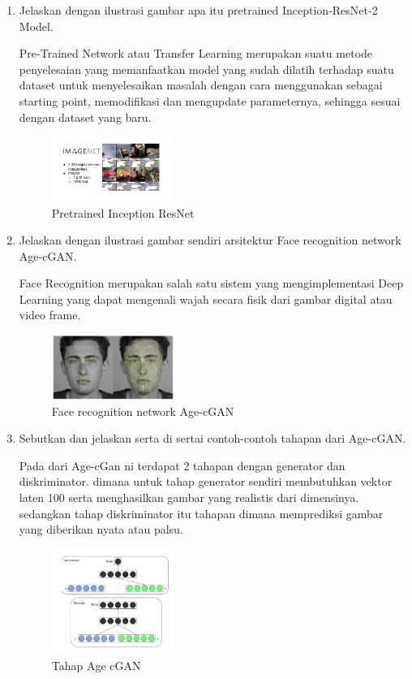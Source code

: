 \begin{enumerate}
        \item Jelaskan dengan ilustrasi gambar apa itu pretrained Inception-ResNet-2 Model.

Pre-Trained Network atau Transfer Learning merupakan suatu metode penyelesaian yang memanfaatkan model yang sudah dilatih terhadap suatu dataset untuk menyelesaikan masalah dengan cara menggunakan sebagai starting point, memodifikasi dan mengupdate parameternya, sehingga sesuai dengan dataset yang baru.

	\begin{figure}[H]
		\includegraphics[width=4cm]{figures/1174069/9/teori6.PNG}
            	\centering
           	\caption{Pretrained Inception ResNet}
       	 \end{figure}

        \item Jelaskan dengan ilustrasi gambar sendiri arsitektur Face recognition network Age-cGAN.

Face Recognition merupakan salah satu sistem yang mengimplementasi Deep Learning yang dapat mengenali wajah secara fisik dari gambar digital atau video frame.

	\begin{figure}[H]
		\includegraphics[width=4cm]{figures/1174069/9/teori7.PNG}
            	\centering
           	 \caption{Face recognition network Age-cGAN}
       	 \end{figure}

        \item Sebutkan dan jelaskan serta di sertai contoh-contoh tahapan dari Age-cGAN.

Pada dari Age-cGan ni terdapat 2 tahapan dengan generator dan diskriminator. dimana untuk tahap generator sendiri membutuhkan vektor laten 100 serta menghasilkan gambar yang realistis dari dimensinya. sedangkan tahap diskriminator itu tahapan dimana memprediksi gambar yang diberikan nyata atau palsu.

	\begin{figure}[H]
		\includegraphics[width=4cm]{figures/1174069/9/teori8.PNG}
            	\centering
           	 \caption{Tahap Age cGAN}
       	 \end{figure}


\end{enumerate}
